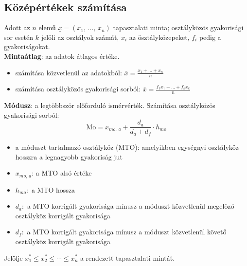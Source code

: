 \documentclass[12pt]{article}
\begin{document}
    \subsection{Középértékek számítása}
    Adott az $n$ elemű $\underline{x} = (x_1, \, \dots, \, x_n)$ tapasztalati minta; osztályközös gyakorisági sor esetén $k$ jelöli az osztályok számát, $x_i$ az ösztályközepeket, $f_i$ pedig a gyakoriságokat.\\

    \textbf{Mintaátlag}: az adatok átlagos értéke.
    \begin{itemize}
        \item számítása közvetlenül az adatokból: $\bar{x} = \displaystyle\frac{x_1 + \dots + x_n}{n}$
        \item számítása osztályközös gyakorisági sorból: $\bar{x} = \displaystyle\frac{f_1 x_1 + \dots + f_kx_k}{n}$
    \end{itemize}

    \textbf{Módusz}: a legtöbbször előforduló ismérvérték. Számítása osztályközös gyakorisági sorból:
    \[
        \text{Mo} = x_{mo, \, a} + \frac{d_a}{d_a + d_f} \cdot h_{mo}
    \]
    \begin{itemize}
        \item a móduszt tartalmazó osztályköz (MTO): amelyikben egységnyi osztályköz hosszra a legnagyobb gyakoriság jut
        \item $x_{mo, \, a}$: a MTO alsó értéke
        \item $h_{mo}:$ a MTO hossza
        \item $d_a:$ a MTO korrigált gyakorisága mínusz a móduszt közvetlenül megelőző osztályköz korrigált gyakorisága
        \item $d_f:$ a MTO korrigált gyakorisága mínusz a móduszt közvetlenül követő osztályköz korrigált gyakorisága 
    \end{itemize}

    Jelölje $x_1^* \leq x_2^* \leq \cdots \leq x_n^*$ a rendezett tapasztalati mintát.\\
\end{document}
